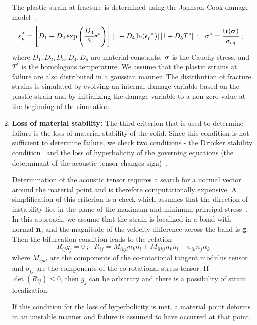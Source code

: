 \begin{enumerate}
{       The plastic strain at fracture is determined using the Johnson-Cook
       damage model~\cite{Johnson1985}:
       \begin{equation}
         \varepsilon_p^f = 
         \left[D_1 + D_2 \exp \left(\cfrac{D_3}{3} \sigma^*\right)\right]
         \left[1+ D_4 \ln(\dot{\epsilon_p}^*)\right]
         \left[1+D_5 T^*\right]~;~~
         \sigma^*= \cfrac{\text{tr}(\boldsymbol{\sigma})}{\sigma_{eq}}~;~~
       \end{equation}
       where $D_1, D_2, D_3, D_4, D_5$ are material constants, 
       $\boldsymbol{\sigma}$ is the Cauchy stress, and $T^*$ is the homologous temperature.
       We assume that the plastic strains at failure are also distributed
       in a gaussian manner.  The distribution of fracture strains is 
       simulated by evolving an internal damage variable based on the plastic 
       strain and by initializing the damage variable to a non-zero value
       at the beginning of the simulation.
       \vspace{10pt}
       }

    \item {
       {\bf Loss of material stability:} \hspace{12pt}
       The third criterion that is used to 
       determine failure is the loss of material stability of the solid.
       Since this condition is not sufficient to determine failure, we check
       two conditions - the Drucker stability condition~\cite{Drucker1959} 
       and the loss of hyperbolicity of the governing equations (the determinant
       of the acoustic tensor changes sign)~\cite{Rudnicki1975,Perzyna1998}.  

       Determination of the acoustic tensor requires a search for a normal 
       vector around the material point and is therefore computationally 
       expensive.  A simplification of this criterion is a check which 
       assumes that the direction of instability lies in the plane of the 
       maximum and minimum principal stress~\cite{Becker2002}.  In this 
       approach, we assume that the strain is localized in a band with 
       normal $\mathbf{n}$, and the magnitude of the velocity difference across 
       the band is $\mathbf{g}$.  Then the bifurcation condition leads to the relation 
       \begin{equation} 
         R_{ij} g_{j} = 0 ~;~~~
         R_{ij} = M_{ikjl} n_k n_l + M_{ilkj} n_k n_l - \sigma_{ik} n_j n_k
       \end{equation} 
       where $M_{ijkl}$ are the components of the co-rotational tangent
       modulus tensor and $\sigma_{ij}$ are the components of the co-rotational 
       stress tensor.  If $\det(R_{ij}) \le 0 $, then $g_j$ can be arbitrary 
       and there is a possibility of strain localization.  

       If this condition 
       for the loss of hyperbolicity is met, a material point deforms in an 
       unstable manner and failure is assumed to have occurred at that point.  
       }
  \end{enumerate}
  
